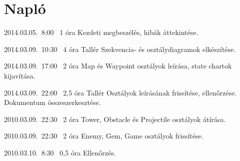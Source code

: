 %
\section{Napló}

\begin{naplo}


\bejegyzes
{2014.03.05.~8:00~} %
{1 óra} %
{\vadam\newline
\vantal\newline
\vbator\newline
\vtorok} %
{Kezdeti megbeszélés, hibák áttekintése.} %

\bejegyzes
{2014.03.09.~10:30~} %
{4 óra} %
{Tallér} %
{Szekvencia- és osztálydiagramok elkészítése.}

\bejegyzes
{2014.03.09.~17:00~}
{2 óra}
{\vadam}
{Map és Waypoint osztályok leírása, state chartok kijavítása.}

\bejegyzes
{2014.03.09.~22:00~} %
{2,5 óra} %
{Tallér} %
{Osztályok leírásának frissítése, ellenőrzése. Dokumentum összeszerkesztése.}

\bejegyzes
{2010.03.09.~22:30~}
{2 óra}
{\vadam}
{Tower, Obstacle és Projectile osztályok átírása.}

\bejegyzes
{2010.03.09.~22:30~}
{2 óra}
{\vantal}
{Enemy, Gem, Game osztályok frissítése.}

\bejegyzes
{2010.03.10.~8:30~}
{0,5 óra}
{\vbator}
{Ellenőrzés.}


\end{naplo}

